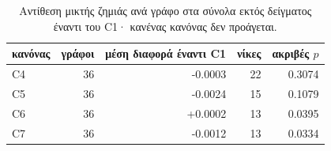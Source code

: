 \begin{table}[t]
\centering
\small
\caption{Αντίθεση μικτής ζημιάς ανά γράφο στα σύνολα εκτός δείγματος έναντι του C1· κανένας κανόνας δεν προάγεται.}
\label{tab:v2mixed}
\begin{tabular}{@{}lrrrr@{}}\toprule
κανόνας & γράφοι & μέση διαφορά έναντι C1 & νίκες & ακριβές $p$ \\
\midrule
C4 & 36 & -0.0003 & 22 & 0.3074 \\
C5 & 36 & -0.0024 & 15 & 0.1079 \\
C6 & 36 & +0.0002 & 13 & 0.0395 \\
C7 & 36 & -0.0012 & 13 & 0.0334 \\
\bottomrule\end{tabular}
\end{table}
